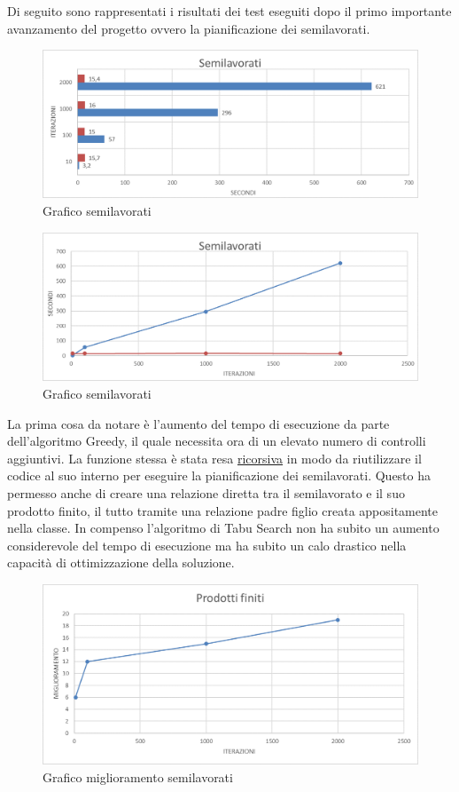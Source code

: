Di seguito sono rappresentati i risultati dei test eseguiti dopo il primo importante avanzamento del progetto ovvero la pianificazione dei semilavorati.
\begin{figure}[H]
	\includegraphics[width=13cm]{immagini/graficoSL.png}
	\centering
	\caption{Grafico semilavorati}
\end{figure}

\begin{figure}[H]
	\includegraphics[width=13cm]{immagini/graficosl2.png}
	\centering
	\caption{Grafico semilavorati}
\end{figure}

La prima cosa da notare è l'aumento del tempo di esecuzione da parte dell'algoritmo Greedy, il quale necessita ora di un elevato numero di controlli aggiuntivi. La funzione
stessa è stata resa \hyperref[Ricorsione]{ricorsiva\glo} in modo da riutilizzare il codice al suo interno per eseguire la pianificazione dei semilavorati. Questo ha permesso anche di creare una
relazione diretta tra il semilavorato e il suo prodotto finito, il tutto tramite una relazione padre figlio creata appositamente nella classe.
In compenso l'algoritmo di Tabu Search non ha subito un aumento considerevole del tempo di esecuzione ma ha subito un calo drastico nella capacità di ottimizzazione della
soluzione.

\begin{figure}[H]
	\includegraphics[width=13cm]{immagini/graficosl3.png}
	\centering
	\caption{Grafico miglioramento semilavorati}
\end{figure}

